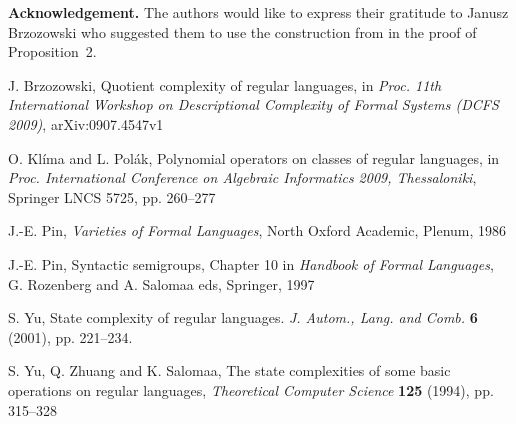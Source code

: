 \documentclass[copyright]{eptcs}
\theoremstyle{definition}
\begin{document}
\noindent
{\bf Acknowledgement.} The authors would like to express their gratitude
to Janusz Brzozowski who suggested them to use the construction from \cite{yzs}
in the proof of Proposition~2.


\begin{thebibliography}{00}\label{biography}

J. Brzozowski, Quotient complexity of regular languages,
in {\it Proc. 11th International Workshop
on Descriptional Complexity of Formal Systems (DCFS 2009)},
arXiv:0907.4547v1
       
O. Klíma and  L. Polák,
Polynomial operators on classes of regular languages,
in {\it Proc.
International Conference on Algebraic Informatics 2009,
Thessaloniki},
Springer LNCS 5725, pp. 260--277

J.-E. Pin,
{\it Varieties of Formal Languages},
North Oxford Academic, Plenum, 1986

J.-E. Pin,
Syntactic semigroups, Chapter 10 in {\it Handbook of Formal Languages},
G. Rozenberg and A. Salomaa eds, Springer, 1997

S. Yu,  State complexity of regular languages. 
{\it J. Autom., Lang. and Comb.} {\bf 6} (2001), pp. 221--234.

  
S. Yu, Q. Zhuang and K. Salomaa, The state complexities of some basic
operations on regular languages, 
{\it Theoretical Computer Science} {\bf 125} (1994), pp.
315­--328

\end{thebibliography}
\end{document}

